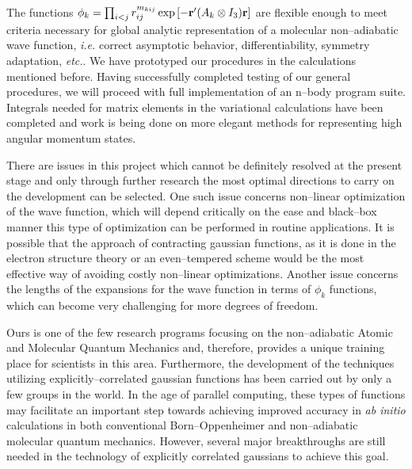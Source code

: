 {{The functions $\phi _k = 
\prod_{i<j}r_{ij}^{m_{kij}}\exp \left[ -{\bf r}^{\prime%
}(A_k\otimes I_3){\bf r}\right]$
are flexible enough to meet criteria necessary for global analytic
representation of a molecular non--adiabatic wave function, {\it i.e.} 
correct
asymptotic behavior, differentiability, symmetry adaptation, {\it etc.}. 
We have prototyped our procedures in the calculations mentioned before. 
Having successfully completed testing of our general procedures, we will
proceed with full implementation of an 
n--body program suite. 
Integrals needed for matrix elements in
the variational calculations have been 
completed and work is being done on
more elegant methods for representing 
high angular momentum states.

There are issues in this project which cannot be definitely
resolved at the present stage and only through further research 
the most optimal directions to carry on the development can be
selected. One such issue concerns non--linear optimization of the
wave function, which will depend 
critically on the ease and black--box
manner this type of optimization 
can be performed in routine applications.
It is possible that the approach of 
contracting gaussian functions,
as it is done in the electron structure theory 
or an even--tempered scheme 
would be the most
effective way of avoiding costly non--linear optimizations.
Another issue concerns the lengths of the expansions for the
wave function in terms of $\phi_k$
functions, which can become very challenging for more degrees
of freedom.



Ours is one of the few research 
programs focusing on the non--adiabatic 
Atomic and Molecular Quantum Mechanics
and, therefore, provides a unique 
training place for scientists in this area.  
Furthermore, the development of the techniques 
utilizing explicitly--correlated gaussian functions
has been carried out by only a few groups in the world.  
In the age of parallel computing, these
types of functions may facilitate an important 
step towards achieving improved accuracy in 
{\it ab initio} calculations in both conventional 
Born--Oppenheimer and non--adiabatic 
molecular quantum mechanics.
However, several major breakthroughs are still needed 
in the technology of explicitly correlated gaussians
to achieve this goal.


\pagebreak


}}
